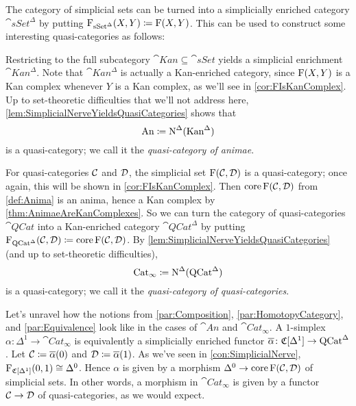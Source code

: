 \begin{exm}\label{exm:SimplicialNerve}
	The category of simplicial sets can be turned into a simplicially enriched category $\cat{sSet}^\Delta$ by putting $\operatorname{F}_{\mathrm{sSet}^\Delta}(X,Y)\coloneqq \operatorname{F}(X,Y)$. This can be used to construct some interesting quasi-categories as follows:
	\begin{alphanumerate}
		\item Restricting to the full subcategory $\cat{Kan}\subseteq \cat{sSet}$ yields a simplicial enrichment $\cat{Kan}^\Delta$. Note that $\cat{Kan}^\Delta$ is actually a Kan-enriched category, since $\operatorname{F}(X,Y)$ is a Kan complex whenever $Y$ is a Kan complex, as we'll see in \cref{cor:FIsKanComplex}. Up to set-theoretic difficulties that we'll not address here, \cref{lem:SimplicialNerveYieldsQuasiCategories} shows that\label{enum:An}
		\begin{equation*}
			\mathrm{An}\coloneqq \operatorname{N}^\Delta(\mathrm{Kan}^\Delta)
		\end{equation*}
		is a quasi-category; we call it the \emph{quasi-category of animae}.
		\item For quasi-categories $\mathcal{C}$ and $\mathcal{D}$, the simplicial set $\operatorname{F}(\mathcal{C},\mathcal{D})$ is a quasi-category; once again, this will be shown in \cref{cor:FIsKanComplex}. Then $\operatorname{core} \operatorname{F}(\mathcal{C},\mathcal{D})$ from \cref{def:Anima} is an anima, hence a Kan complex by \cref{thm:AnimaeAreKanComplexes}. So we can turn the category of quasi-categories $\cat{QCat}$ into a Kan-enriched category $\cat{QCat}^\Delta$ by putting $\operatorname{F}_{\mathrm{QCat}^\Delta}(\mathcal{C},\mathcal{D})\coloneqq \operatorname{core}\operatorname{F}(\mathcal{C},\mathcal{D})$. By \cref{lem:SimplicialNerveYieldsQuasiCategories} (and up to set-theoretic difficulties),\label{enum:CatInfty}
		\begin{equation*}
			\mathrm{Cat}_\infty\coloneqq \operatorname{N}^\Delta(\mathrm{QCat}^\Delta)
		\end{equation*}
		is a quasi-category; we call it the \emph{quasi-category of  quasi-categories}.
	\end{alphanumerate}
	Let's unravel how the notions from \cref{par:Composition}, \cref{par:HomotopyCategory}, and \cref{par:Equivalence} look like in the cases of $\cat{An}$ and $\cat{Cat}_\infty$. A $1$-simplex $\alpha\colon \Delta^1\rightarrow\cat{Cat}_\infty$ is equivalently a simplicially enriched functor $\ov\alpha\colon\CC[\Delta^1]\rightarrow\cat{QCat}^\Delta$. Let $\Cc\coloneqq \ov\alpha(0)$ and $\Dd\coloneqq \ov\alpha(1)$. As we've seen in \cref{con:SimplicialNerve},  $\operatorname{F}_{\mathfrak{C}[\Delta^1]}(0,1)\cong \Delta^0$. Hence $\alpha$ is given by a morphism $\Delta^0\rightarrow\operatorname{core} \operatorname{F}(\mathcal{C},\mathcal{D})$ of simplicial sets. In other words, a morphism in $\cat{Cat}_\infty$ is given by a functor $\mathcal{C}\rightarrow\mathcal{D}$ of quasi-categories, as we would expect.
	

\end{exm}
